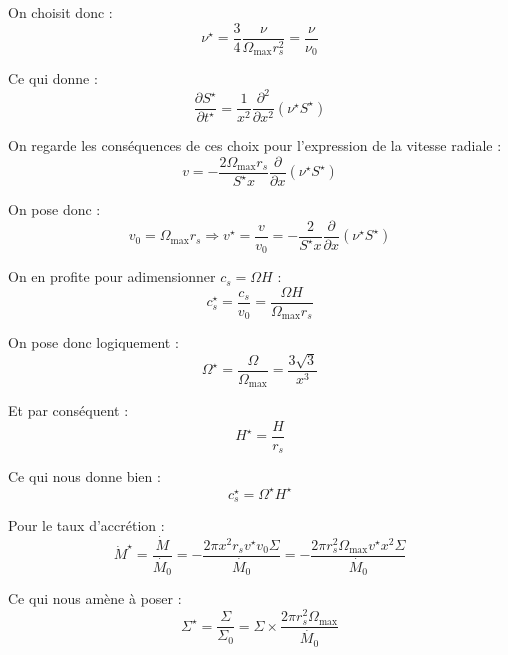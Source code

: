 On choisit donc :
\begin{equation}
    \nu^\star = \frac{3}{4} \frac{\nu}{\Omega_\mathrm{max} r_s^2} = \frac{\nu}{\nu_0}
\end{equation}

Ce qui donne :
\begin{equation}
    \frac{\partial S^\star}{\partial t^\star} = \frac{1}{x^2} \frac{\partial^2}{\partial x^2} \left(\nu^\star S^\star\right)
\end{equation}

On regarde les conséquences de ces choix pour l’expression de la vitesse radiale :
\begin{equation}
    v = - \frac{2 \Omega_\mathrm{max} r_s}{S^\star x} \frac{\partial}{\partial x} \left(\nu^\star S^\star\right)
\end{equation}

On pose donc :
\begin{equation}
    v_0 = \Omega_\mathrm{max} r_s \Rightarrow v^\star = \frac{v}{v_0} = - \frac{2}{S^\star x} \frac{\partial}{\partial x} \left(\nu^\star S^\star\right)
\end{equation}

On en profite pour adimensionner $c_s = \Omega H$ :
\begin{equation}
    c_s^\star = \frac{c_s}{v_0} = \frac{\Omega H}{\Omega_\mathrm{max} r_s}
\end{equation}

On pose donc logiquement :
\begin{equation}
    \Omega^\star = \frac{\Omega}{\Omega_\mathrm{max}} = \frac{3\sqrt{3}}{x^3}
\end{equation}

Et par conséquent :
\begin{equation}
    H^\star = \frac{H}{r_s}
\end{equation}

Ce qui nous donne bien :
\begin{equation}
    c_s^\star = \Omega^\star H^\star
\end{equation}

Pour le taux d’accrétion :
\begin{equation}
    \dot{M}^\star = \frac{\dot{M}}{\dot{M_0}} = - \frac{2 \pi x^2 r_s v^\star v_0 \Sigma}{\dot{M_0}} = - \frac{2 \pi r_s^2 \Omega_\mathrm{max} v^\star x^2 \Sigma}{\dot{M_0}} 
\end{equation}

Ce qui nous amène à poser :
\begin{equation}
    \Sigma^\star = \frac{\Sigma}{\Sigma_0} = \Sigma \times \frac{2 \pi r_s^2 \Omega_\mathrm{max}}{\dot{M_0}}
\end{equation}

